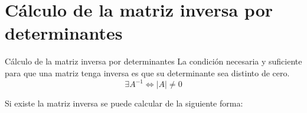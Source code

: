 \documentclass[9pt]{beamer}
\begin{document}
\begin{frame}
\end{frame}
\section{Cálculo de la matriz inversa por determinantes}

\begin{frame}{Cálculo de la matriz inversa por determinantes}
La condición necesaria y suficiente para que una matriz tenga inversa es que su determinante sea distinto de cero.
\[ \exists A^{-1} \Leftrightarrow |A| \neq 0 \]

\pause

Si existe la matriz inversa se puede calcular de la siguiente forma:

\begin{center}
\resaltado{
\[ A^{-1}= \dfrac{1}{|A|}\cdot \left[ Adj (A) \right]^t = \dfrac{1}{|A|}\cdot Adj  \left( A^t \right) \]
} 
\end{center}

\end{frame}
\end{document}
